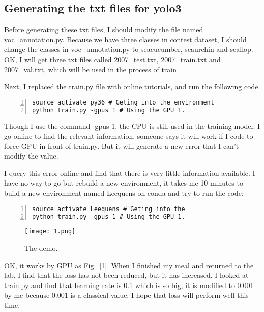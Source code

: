 \documentclass[a4paper]{article}
\begin{document}
\subsection{Generating the txt files for yolo3 \cite{note2}}
Before generating these txt files, I should modify the file named voc\_annotation.py. Because we have three classes in contest dataset, I should change the classes in voc\_annotation.py to seacucumber, seaurchin and scallop. OK, I will get three txt files called 2007\_test.txt, 2007\_train.txt and 2007\_val.txt, which will be used in the process of train
\par
Next, I replaced the train.py file with online tutorials, and run the following code.
\begin{lstlisting}[numbers=left, numberstyle=\tiny,keywordstyle=\color{blue!70},commentstyle=\color{red!50!green!50!blue!50},frame=shadowbox, rulesepcolor=\color{red!20!green!20!blue!20}] 
source activate py36 # Geting into the environment
python train.py -gpus 1 # Using the GPU 1. 
\end{lstlisting}
Though I use the command -gpus 1, the CPU is still used in the training model. I go online to find the relevant information, someone says it will work if I code to force GPU in front of train.py. But it will generate a new error that I can't modify the value.
\par
I query this error online and find that there is very little information available. I have no way to go but rebuild a new environment, it takes me 10 minutes to build a new environment named Leequens on conda and try to run the code:
\begin{lstlisting}[numbers=left, numberstyle=\tiny,keywordstyle=\color{blue!70},commentstyle=\color{red!50!green!50!blue!50},frame=shadowbox, rulesepcolor=\color{red!20!green!20!blue!20}] 
source activate Leequens # Geting into the 
python train.py -gpus 1 # Using the GPU 1. 
\end{lstlisting}
\begin{figure}[h]
	\begin{center}
		\texttt{[image: 1.png]}\\
		\caption{The demo.}\label{2}
	\end{center}
\end{figure}
OK, it works by GPU as Fig.~\ref{1}. When I finished my meal and returned to the lab, I find that the loss has not been reduced, but it has increased. I looked at train.py and find that learning rate is 0.1 which is so big, it is modified to 0.001 by me because 0.001 is a classical value. I hope that loss will perform well this time.
\end{document}
